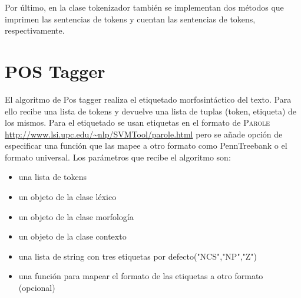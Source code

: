Por último, en la clase tokenizador también se implementan dos métodos que imprimen las sentencias de tokens y cuentan las sentencias de tokens, respectivamente. 

\section{POS Tagger}
El algoritmo de Pos tagger realiza el etiquetado morfosintáctico del texto. Para ello recibe una lista de tokens y devuelve una lista de tuplas (token, etiqueta) de los mismos. Para el etiquetado se usan etiquetas en el formato de \textsc{Parole} \url{http://www.lsi.upc.edu/~nlp/SVMTool/parole.html}  pero se añade opción de especificar una función que las mapee a otro formato como PennTreebank o el formato universal. \newline
Los parámetros que recibe el algoritmo son: 
\begin{itemize}
\item una lista de tokens
\item un objeto de la clase léxico
\item un objeto de la clase morfología
\item un objeto de la clase contexto
\item una lista de string con tres etiquetas por defecto("NCS","NP","Z")
\item una función para mapear el formato de las etiquetas a otro formato (opcional)
\end{itemize}

